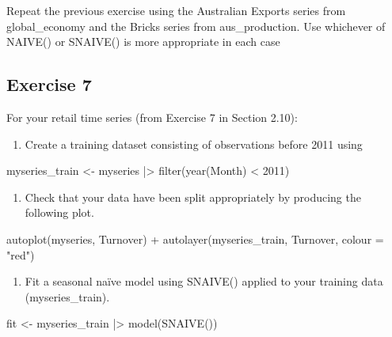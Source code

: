 \documentclass[
  11pt,
]{article}
\newenvironment{Shaded}{\begin{snugshade}}{\end{snugshade}}
\newcommand{\NormalTok}[1]{\textcolor[rgb]{0.00,0.23,0.31}{#1}}
\providecommand{\tightlist}{%
  \setlength{\itemsep}{0pt}\setlength{\parskip}{0pt}}\usepackage{longtable,booktabs,array}
\begin{document}
Repeat the previous exercise using the Australian Exports series from
global\_economy and the Bricks series from aus\_production. Use
whichever of NAIVE() or SNAIVE() is more appropriate in each case

\subsection{Exercise 7}\label{exercise-7}

For your retail time series (from Exercise 7 in Section 2.10):

\begin{enumerate}
\def\labelenumi{\alph{enumi}.}
\tightlist
\item
  Create a training dataset consisting of observations before 2011 using
\end{enumerate}

\begin{Shaded}
\begin{Highlighting}[]
\NormalTok{myseries\_train \textless{}{-} myseries |\textgreater{}}
\NormalTok{  filter(year(Month) \textless{} 2011)}
\end{Highlighting}
\end{Shaded}

\begin{enumerate}
\def\labelenumi{\alph{enumi}.}
\setcounter{enumi}{1}
\tightlist
\item
  Check that your data have been split appropriately by producing the
  following plot.
\end{enumerate}

\begin{Shaded}
\begin{Highlighting}[]
\NormalTok{autoplot(myseries, Turnover) +}
\NormalTok{  autolayer(myseries\_train, Turnover, colour = "red")}
\end{Highlighting}
\end{Shaded}

\begin{enumerate}
\def\labelenumi{\alph{enumi}.}
\setcounter{enumi}{2}
\tightlist
\item
  Fit a seasonal naïve model using SNAIVE() applied to your training
  data (myseries\_train).
\end{enumerate}

\begin{Shaded}
\begin{Highlighting}[]
\NormalTok{fit \textless{}{-} myseries\_train |\textgreater{}}
\NormalTok{  model(SNAIVE())}
\end{Highlighting}
\end{Shaded}
\end{document}
